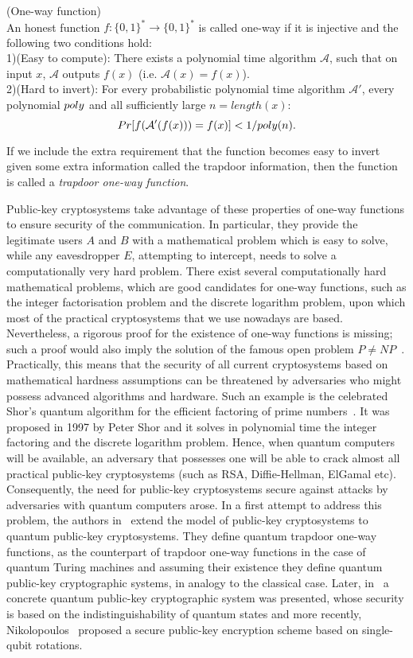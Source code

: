 \begin{definition} (One-way function)\\
An honest function $f:\{0,1\}^*\rightarrow \{0,1\}^*$ is called one-way if it is injective and the following two conditions hold:\\
1)(Easy to compute): There exists a polynomial time algorithm $\mathcal{A}$, such that on input $x$, $\mathcal{A}$ outputs $f(x)$ (i.e. $\mathcal{A}(x)=f(x)$).\\
2)(Hard to invert): For every probabilistic polynomial time algorithm $\mathcal{A}'$, every polynomial $poly$ and all sufficiently large $n=length(x):$
$$Pr[f(\mathcal{A}'(f(x)))=f(x)]<1/poly(n).$$
\end{definition}
If we include the extra requirement that the function becomes easy to invert given some extra information called the trapdoor information, then the function is called a {\em trapdoor one-way function}. 

Public-key cryptosystems take advantage of these properties of one-way functions to ensure security of the communication. In particular, they provide the legitimate users $A$ and $B$ with a mathematical problem which is easy to solve, while any eavesdropper $E$, attempting to intercept, needs to solve a computationally very hard problem. 
There exist several computationally hard mathematical problems, which are good candidates for one-way functions, such as the integer factorisation problem and the discrete logarithm problem, upon which most of the practical cryptosystems that we use nowadays are based. Nevertheless, a rigorous proof for the existence of one-way functions is missing; such a proof would also imply the solution of the famous open problem $P\neq NP$~\cite{fort:13}. Practically, this means that the security of all current cryptosystems based on mathematical hardness assumptions can be threatened by adversaries who might possess advanced algorithms and hardware. Such an example is the celebrated Shor's quantum algorithm for the  efficient factoring of prime numbers~\cite{sho:97}. It was proposed in 1997 by Peter Shor and it solves in polynomial time the integer factoring and the discrete logarithm problem. Hence, when quantum computers will be available, an adversary that possesses one will be able to crack almost all practical public-key cryptosystems (such as RSA, Diffie-Hellman, ElGamal etc). Consequently, the need for public-key cryptosystems secure against attacks by adversaries with quantum computers arose. In a first attempt to address this problem, the authors in~\cite{oka:tan:uch:00} extend the model of public-key cryptosystems to quantum public-key cryptosystems. They  define quantum trapdoor one-way functions, as the counterpart of trapdoor one-way functions in the case of quantum Turing machines and assuming their existence they define quantum public-key cryptographic systems, in analogy to the classical case. Later, in~\cite{kaw:etal:05} a concrete quantum public-key cryptographic system was presented, whose security is based on the indistinguishability of quantum states and more recently, Nikolopoulos~\cite{nik:08,sey:nik:alb:12}  proposed a secure public-key encryption scheme based on single-qubit rotations. 




